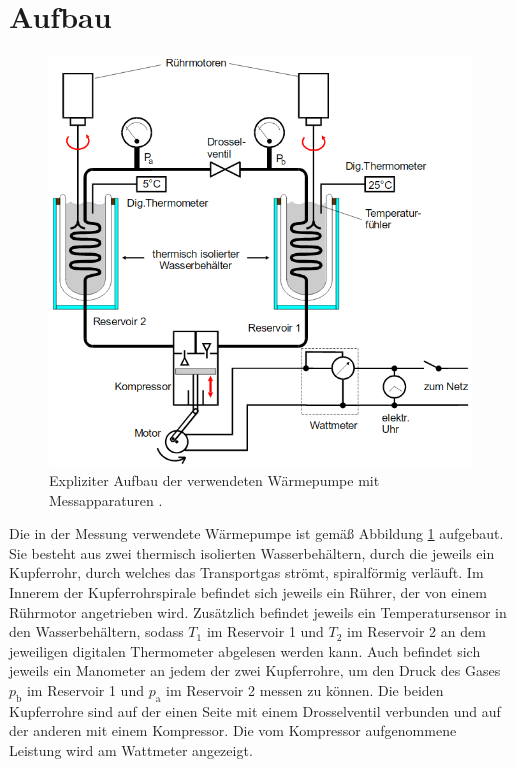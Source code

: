 \section{Aufbau}
\label{sec:Aufbau}
\begin{figure}
	\centering
	\includegraphics[width=\linewidth-100pt,height=\textheight-100pt,keepaspectratio]{content/Bilder/Aufbau2.png}
	\caption{Expliziter Aufbau der verwendeten Wärmepumpe mit Messapparaturen \cite{V206}.}
	\label{fig:Aufbau2}
\end{figure}
Die in der Messung verwendete Wärmepumpe ist gemäß Abbildung \ref{fig:Aufbau2} aufgebaut. Sie besteht aus zwei thermisch isolierten Wasserbehältern, durch die jeweils ein Kupferrohr, durch welches das Transportgas strömt, spiralförmig verläuft. Im Innerem der Kupferrohrspirale befindet sich jeweils ein Rührer, der von einem Rührmotor angetrieben wird. Zusätzlich befindet jeweils ein Temperatursensor in den Wasserbehältern, sodass $T_1$ im Reservoir 1 und $T_2$ im Reservoir 2 an dem jeweiligen digitalen Thermometer abgelesen werden kann. Auch befindet sich jeweils ein Manometer an jedem der zwei Kupferrohre, um den Druck des Gases $p_\text{b}$ im Reservoir 1 und $p_\text{a}$ im Reservoir 2 messen zu können. Die beiden Kupferrohre sind auf der einen Seite mit einem Drosselventil verbunden und auf der anderen mit einem Kompressor. Die vom Kompressor aufgenommene Leistung wird am Wattmeter angezeigt.